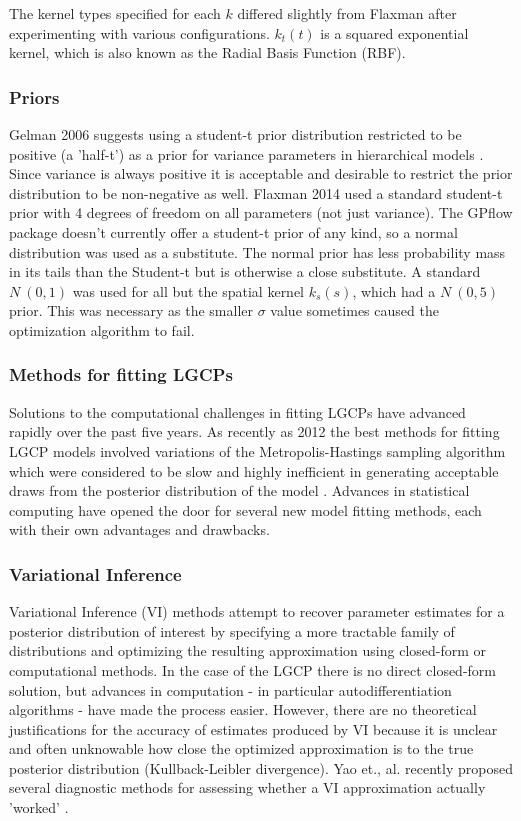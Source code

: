 \documentclass{article}
\begin{document}
The kernel types specified for each $k$ differed slightly from Flaxman after experimenting with various configurations. $k_t(t)$ is a squared exponential kernel, which is also known as the Radial Basis Function (RBF).


\subsubsection{Priors}

Gelman 2006 suggests using a student-t prior distribution restricted to be positive (a 'half-t') as a prior for variance parameters in hierarchical models \cite{gelman_2006}. Since variance is always positive it is acceptable and desirable to restrict the prior distribution to be non-negative as well. Flaxman 2014 used a standard student-t prior with 4 degrees of freedom on all parameters (not just variance). The GPflow package doesn't currently offer a student-t prior of any kind, so a normal distribution was used as a substitute. The normal prior has less probability mass in its tails than the Student-t but is otherwise a close substitute. A standard $N~(0,1)$ was used for all but the spatial kernel $k_s(s)$, which had a $N~(0,5)$ prior. This was necessary as the smaller $\sigma$ value sometimes caused the optimization algorithm to fail.

\subsubsection{Methods for fitting LGCPs}

Solutions to the computational challenges in fitting LGCPs have advanced rapidly over the past five years. As recently as 2012 the best methods for fitting LGCP models involved variations of the Metropolis-Hastings sampling algorithm which were considered to be slow and highly inefficient in generating acceptable draws from the posterior distribution of the model \cite{murray_2012}. Advances in statistical computing have opened the door for several new model fitting methods, each with their own advantages and drawbacks.

\subsubsection{Variational Inference}

Variational Inference (VI) methods attempt to recover parameter estimates for a posterior distribution of interest by specifying a more tractable family of distributions and optimizing the resulting approximation using closed-form or computational methods. In the case of the LGCP there is no direct closed-form solution, but advances in computation - in particular autodifferentiation algorithms - have made the process easier. However, there are no theoretical justifications for the accuracy of estimates produced by VI because it is unclear and often unknowable how close the optimized approximation is to the true posterior distribution (Kullback-Leibler divergence). Yao et., al. recently proposed several diagnostic methods for assessing whether a VI approximation actually 'worked' \cite{yao_2018}.
\end{document}
